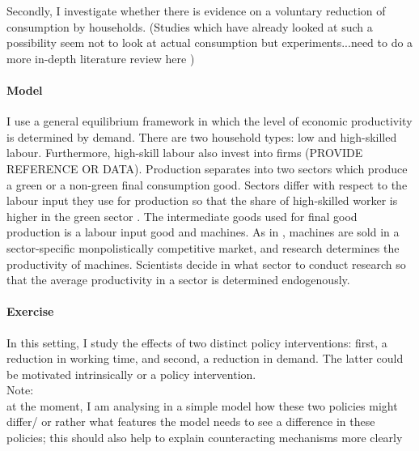 Secondly, I investigate whether there is evidence on a voluntary reduction of consumption by households. (Studies which have already looked at such a possibility seem not to look at actual consumption but experiments...need to do a more in-depth literature review here )


\paragraph{Model}
I use a general equilibrium framework in which the level of economic productivity is determined by demand. There are two household types: low and high-skilled labour. Furthermore, high-skill labour also invest into firms (PROVIDE REFERENCE OR DATA). Production separates into two sectors which produce a green or a non-green final consumption good. Sectors differ with respect to the labour input they use for production so that the share of high-skilled worker is higher in the green sector \citep[as found by][for the US]{Consoli2016DoCapital}. The intermediate goods used for final good production is a labour input good and machines. As in \cite{Acemoglu2012TheChange}, machines are sold in a sector-specific monpolistically competitive market, and research determines the productivity of machines. Scientists decide in what sector to conduct research so that the average productivity in a sector is determined endogenously.

\paragraph{Exercise}
In this setting, I study the effects of two distinct policy interventions: first, a reduction in working time, and second, a reduction in demand. The latter could be motivated intrinsically  or a policy intervention. \\
Note: \\
  at the moment, I am analysing in a simple model how these two policies might differ/ or rather what features the model needs to see a difference in these policies; this should also help to explain counteracting mechanisms more clearly\\

%
%
%


